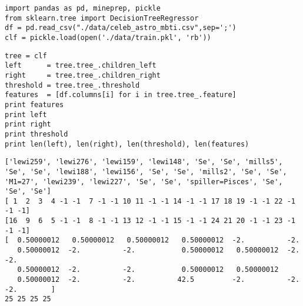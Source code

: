 \documentclass[12pt,fleqn]{article}\usepackage{../common}
\begin{document}
\begin{verbatim}
import pandas as pd, mineprep, pickle
from sklearn.tree import DecisionTreeRegressor
df = pd.read_csv("./data/celeb_astro_mbti.csv",sep=';')
clf = pickle.load(open('./data/train.pkl', 'rb'))
\end{verbatim}

\begin{verbatim}
tree = clf
left      = tree.tree_.children_left
right     = tree.tree_.children_right
threshold = tree.tree_.threshold
features  = [df.columns[i] for i in tree.tree_.feature]
print features
print left
print right
print threshold
print len(left), len(right), len(threshold), len(features)
\end{verbatim}

\begin{verbatim}
['lewi259', 'lewi276', 'lewi159', 'lewi148', 'Se', 'Se', 'mills5', 'Se', 'Se', 'lewi188', 'lewi156', 'Se', 'Se', 'mills2', 'Se', 'Se', 'M1=27', 'lewi239', 'lewi227', 'Se', 'Se', 'spiller=Pisces', 'Se', 'Se', 'Se']
[ 1  2  3  4 -1 -1  7 -1 -1 10 11 -1 -1 14 -1 -1 17 18 19 -1 -1 22 -1 -1 -1]
[16  9  6  5 -1 -1  8 -1 -1 13 12 -1 -1 15 -1 -1 24 21 20 -1 -1 23 -1 -1 -1]
[  0.50000012   0.50000012   0.50000012   0.50000012  -2.          -2.
   0.50000012  -2.          -2.           0.50000012   0.50000012  -2.          -2.
   0.50000012  -2.          -2.           0.50000012   0.50000012
   0.50000012  -2.          -2.          42.5         -2.          -2.          -2.        ]
25 25 25 25
\end{verbatim}
\end{document}
